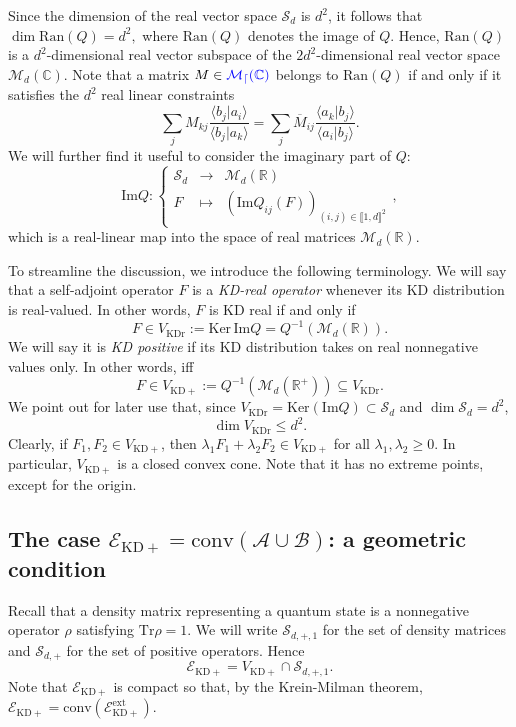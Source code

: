 \documentclass[a4paper, notitlepage, 11pt]{article}
\numberwithin{equation}{section}
\newcommand{\blue}[1]{{\color{blue} #1}}
\newcommand{\mcl}[1]{\mathcal{#1}}
\newcommand{\Acal}{{\mathcal A}}
\newcommand{\Bcal}{{\mathcal B}}
\newcommand{\EcalKDC}{{\mathcal E}_{\mathrm{KD+}}}
\newcommand{\EcalKDCext}{{\mathcal E}_{\mathrm{KD+}}^{\mathrm{ext}}}
\newcommand{\Ker}{{\mathrm{Ker}}}
\newcommand{\R}{\mathbb{R}}
\newcommand{\C}{\mathbb{C}}
\newcommand{\conv}[1]{\mathrm{conv}\left(#1\right)}
\newcommand{\VR}{V_{\mathrm{KDr}}}
\newcommand{\VRp}{V_{\mathrm{KD+}}}
\renewcommand{\Im}[1]{\mathrm{Im}#1}
\newcommand{\Ran}[1]{\mathrm{Ran}\left(#1\right)}
\newcommand{\SAO}{\mathcal{S}_{d}}
\newcommand{\SAOpone}{\mathcal{S}_{d,+,1}}
\newcommand{\SAOp}{\mathcal{S}_{d,+}}
\newcommand{\MatC}[1]{\mcl{M}_{#1}(\C)}
\newcommand{\MatR}[1]{\mcl{M}_{#1}(\R)}
\newcommand{\IntEnt}[2]{\llbracket #1 , #2 \rrbracket}
\newcommand{\convAB}{\conv{\Acal \cup \Bcal}}
\begin{document}
Since  the dimension of the real vector space $\SAO$ is $d^2$, it follows that
$\dim \Ran Q= d^2,$ where $\Ran{Q}$ denotes the image of {$Q$}. Hence, $\Ran Q$ is a $d^2$-dimensional real vector subspace of the $2d^2$-dimensional real vector space $\MatC{d}$. Note that a matrix $M\in\mathcal \blue{\MatC{d}}$  belongs to $\Ran Q$ if and only if it satisfies the $d^2$ real linear constraints 
\[
\sum_j M_{kj}\frac{\langle b_j|a_i\rangle}{\langle b_j|a_k\rangle}=\sum_j\overline{M}_{ij}\frac{\langle a_k|b_j\rangle}{\langle a_i|b_j\rangle}.
\]
We will further find it useful to consider the imaginary part of $Q$:
\[
\Im{Q}: \left\{\begin{array}{rcl}
\SAO  & \rightarrow &\MatR{d} \\
 F & \mapsto & (\Im{Q_{ij}(F)})_{(i,j)\in\IntEnt{1}{d}^2}
\end{array}\right.,
 \]
which is a real-linear map into the space of real matrices $\MatR{d}$. 

To streamline the discussion, we introduce the following terminology. We will say that a self-adjoint operator $F$ is a \emph{KD-real operator}
whenever its KD distribution is real-valued. In other words, $F$ is KD real if and only if 
\[
F\in\VR:=\Ker\,{\mathrm{Im}}Q=Q^{-1}(\mcl{M}_{d}(\R)).
\]
 We will say it is \emph{KD positive}  
 if its KD distribution takes on real nonnegative values only. In other words, iff 
 \[
 F\in \VRp:=Q^{-1}(\mcl{M}_{d}(\R^{+})) \subseteq \VR.
 \]
 We point out for later use that, since $\VR= \Ker(\mathrm{Im} Q)\subset \SAO$ and $\dim\SAO=d^2$, 
 \begin{equation}
 \dim \VR \leq d^2.
 \end{equation}
Clearly,  if $F_1, F_2\in\VRp$, then $\lambda_1 F_1+\lambda_2F_2\in\VRp$ for all $\lambda_1, \lambda_2\geq 0$. In particular,
$\VRp$ is a closed convex cone. Note that it has no extreme points, except for the origin. 


\subsection{The case $\EcalKDC=\convAB$: a geometric condition}
Recall that a density matrix representing a quantum state  is a nonnegative operator $\rho$ satisfying $\mathrm{Tr}\rho=1$. We will write $\SAOpone$ for the set of density matrices and $\SAOp$ for the set of positive operators.  Hence 
\begin{equation}\label{eq:EcalKDCchar}
\EcalKDC=\VRp\cap \SAOpone.
\end{equation}
Note that $\EcalKDC$ is compact
so that, by the Krein-Milman theorem,
$
\EcalKDC=\conv{\EcalKDCext}.
$
\end{document}
